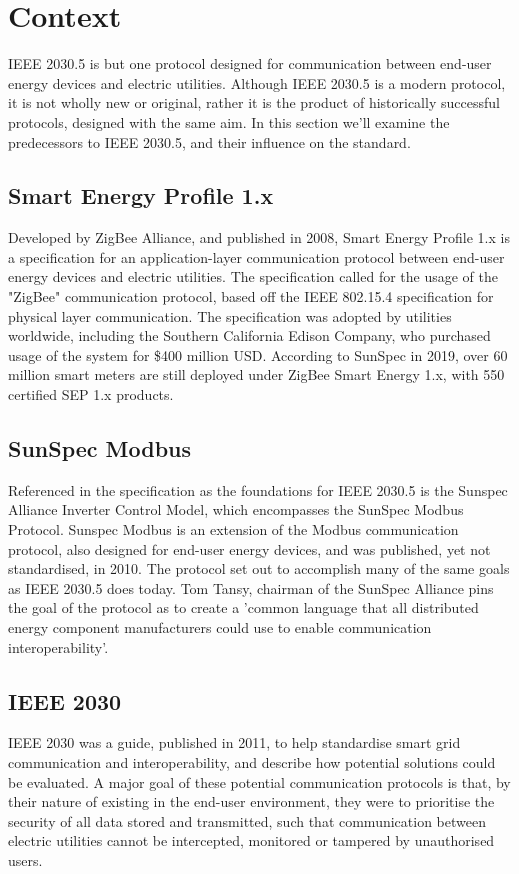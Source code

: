 \chapter{Context}\label{ch:context}

IEEE 2030.5 is but one protocol designed for communication between end-user energy devices and electric utilities. 
Although IEEE 2030.5 is a modern protocol, it is not wholly new or original, rather it is the product of historically successful protocols, designed with the same aim.
In this section we'll examine the predecessors to IEEE 2030.5, and their influence on the standard.

\section{Smart Energy Profile 1.x}
Developed by ZigBee Alliance, and published in 2008, Smart Energy Profile 1.x is a specification for an application-layer communication protocol between end-user energy devices and electric utilities. 
The specification called for the usage of the "ZigBee" communication protocol, based off the IEEE 802.15.4 specification for physical layer communication. \cite[]{ZigBeeSEP} \hfill \break
The specification was adopted by utilities worldwide, including the Southern California Edison Company, who purchased usage of the system for \$400 million USD. \cite[]{SEP1Article} \hfill \break
According to SunSpec in 2019, over 60 million smart meters are still deployed under ZigBee Smart Energy 1.x, with 550 certified SEP 1.x products. \cite[]{20305workshop}


\section{SunSpec Modbus}
Referenced in the specification as the foundations for IEEE 2030.5 is the Sunspec Alliance Inverter Control Model, which encompasses the SunSpec Modbus Protocol.
Sunspec Modbus is an extension of the Modbus communication protocol, also designed for end-user energy devices, and was published, yet not standardised, in 2010. The protocol set out to accomplish many of the same goals as IEEE 2030.5 does today. 
Tom Tansy, chairman of the SunSpec Alliance pins the goal of the protocol as to create a 'common language that all distributed energy component manufacturers could use to enable communication interoperability'.
\cite[]{SunspecModbusArticle}

\section{IEEE 2030}
IEEE 2030 was a guide, published in 2011, to help standardise smart grid communication and interoperability, and describe how potential solutions could be evaluated. A major goal of these potential communication protocols is that, by their nature of existing in the end-user environment, they were to prioritise the security of all data stored and transmitted, such that communication between electric utilities cannot be intercepted, monitored or tampered by unauthorised users.

